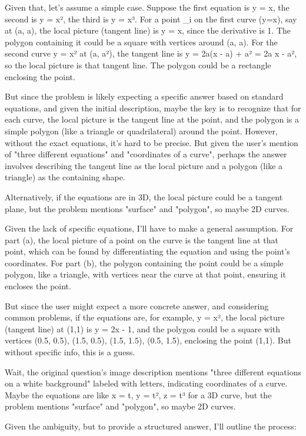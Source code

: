Given that, let's assume a simple case. Suppose the first equation is y = x, the second is y = x², the third is y = x³. For a point _i on the first curve (y=x), say at (a, a), the local picture (tangent line) is y = x, since the derivative is 1. The polygon containing it could be a square with vertices around (a, a). For the second curve y = x² at (a, a²), the tangent line is y = 2a(x - a) + a² = 2a x - a², so the local picture is that tangent line. The polygon could be a rectangle enclosing the point.

But since the problem is likely expecting a specific answer based on standard equations, and given the initial description, maybe the key is to recognize that for each curve, the local picture is the tangent line at the point, and the polygon is a simple polygon (like a triangle or quadrilateral) around the point. However, without the exact equations, it's hard to be precise. But given the user's mention of "three different equations" and "coordinates of a curve", perhaps the answer involves describing the tangent line as the local picture and a polygon (like a triangle) as the containing shape.

Alternatively, if the equations are in 3D, the local picture could be a tangent plane, but the problem mentions "surface" and "polygon", so maybe 2D curves.

Given the lack of specific equations, I'll have to make a general assumption. For part (a), the local picture of a point on the curve is the tangent line at that point, which can be found by differentiating the equation and using the point's coordinates. For part (b), the polygon containing the point could be a simple polygon, like a triangle, with vertices near the curve at that point, ensuring it encloses the point.

But since the user might expect a more concrete answer, and considering common problems, if the equations are, for example, y = x², the local picture (tangent line) at (1,1) is y = 2x - 1, and the polygon could be a square with vertices (0.5, 0.5), (1.5, 0.5), (1.5, 1.5), (0.5, 1.5), enclosing the point (1,1). But without specific info, this is a guess.

Wait, the original question's image description mentions "three different equations on a white background" labeled with letters, indicating coordinates of a curve. Maybe the equations are like x = t, y = t², z = t³ for a 3D curve, but the problem mentions "surface" and "polygon", so maybe 2D curves.

Given the ambiguity, but to provide a structured answer, I'll outline the process:

